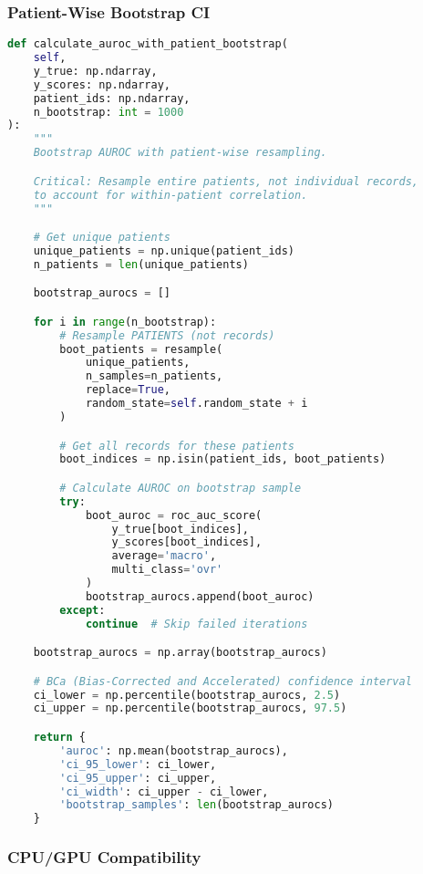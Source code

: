 \documentclass[11pt]{article}
\begin{document}
\subsubsection{Patient-Wise Bootstrap CI}

\begin{lstlisting}[language=Python, caption=Patient-Wise Bootstrap for Confidence Intervals]
def calculate_auroc_with_patient_bootstrap(
    self,
    y_true: np.ndarray,
    y_scores: np.ndarray,
    patient_ids: np.ndarray,
    n_bootstrap: int = 1000
):
    """
    Bootstrap AUROC with patient-wise resampling.

    Critical: Resample entire patients, not individual records,
    to account for within-patient correlation.
    """

    # Get unique patients
    unique_patients = np.unique(patient_ids)
    n_patients = len(unique_patients)

    bootstrap_aurocs = []

    for i in range(n_bootstrap):
        # Resample PATIENTS (not records)
        boot_patients = resample(
            unique_patients,
            n_samples=n_patients,
            replace=True,
            random_state=self.random_state + i
        )

        # Get all records for these patients
        boot_indices = np.isin(patient_ids, boot_patients)

        # Calculate AUROC on bootstrap sample
        try:
            boot_auroc = roc_auc_score(
                y_true[boot_indices],
                y_scores[boot_indices],
                average='macro',
                multi_class='ovr'
            )
            bootstrap_aurocs.append(boot_auroc)
        except:
            continue  # Skip failed iterations

    bootstrap_aurocs = np.array(bootstrap_aurocs)

    # BCa (Bias-Corrected and Accelerated) confidence interval
    ci_lower = np.percentile(bootstrap_aurocs, 2.5)
    ci_upper = np.percentile(bootstrap_aurocs, 97.5)

    return {
        'auroc': np.mean(bootstrap_aurocs),
        'ci_95_lower': ci_lower,
        'ci_95_upper': ci_upper,
        'ci_width': ci_upper - ci_lower,
        'bootstrap_samples': len(bootstrap_aurocs)
    }
\end{lstlisting}

\subsubsection{CPU/GPU Compatibility}
\end{document}
